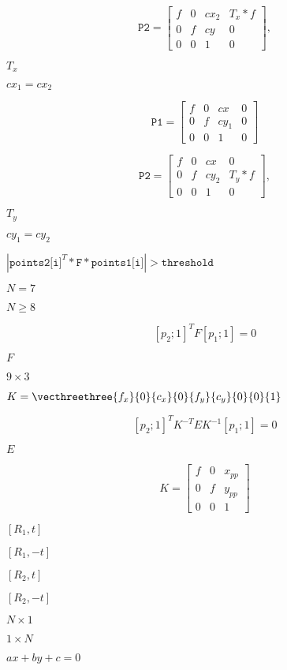 \documentclass{article}
\begin{document}
\[\texttt{P2} = \begin{bmatrix} f & 0 & cx_2 & T_x*f \\ 0 & f & cy & 0 \\ 0 & 0 & 1 & 0 \end{bmatrix} ,\]
\pagebreak

$T_x$
\pagebreak

$cx_1=cx_2$
\pagebreak

\[\texttt{P1} = \begin{bmatrix} f & 0 & cx & 0 \\ 0 & f & cy_1 & 0 \\ 0 & 0 & 1 & 0 \end{bmatrix}\]
\pagebreak

\[\texttt{P2} = \begin{bmatrix} f & 0 & cx & 0 \\ 0 & f & cy_2 & T_y*f \\ 0 & 0 & 1 & 0 \end{bmatrix} ,\]
\pagebreak

$T_y$
\pagebreak

$cy_1=cy_2$
\pagebreak

$|\texttt{points2[i]}^T*\texttt{F}*\texttt{points1[i]}|>\texttt{threshold}$
\pagebreak

$N = 7$
\pagebreak

$N \ge 8$
\pagebreak

\[[p_2; 1]^T F [p_1; 1] = 0\]
\pagebreak

$F$
\pagebreak

$9 \times 3$
\pagebreak

$K = \vecthreethree{f_x}{0}{c_x}{0}{f_y}{c_y}{0}{0}{1}$
\pagebreak

\[[p_2; 1]^T K^{-T} E K^{-1} [p_1; 1] = 0\]
\pagebreak

$E$
\pagebreak

\[K = \begin{bmatrix} f & 0 & x_{pp} \\ 0 & f & y_{pp} \\ 0 & 0 & 1 \end{bmatrix}\]
\pagebreak

$[R_1, t]$
\pagebreak

$[R_1, -t]$
\pagebreak

$[R_2, t]$
\pagebreak

$[R_2, -t]$
\pagebreak

$N \times 1$
\pagebreak

$1 \times N$
\pagebreak

$ax + by + c=0$
\pagebreak
\end{document}
